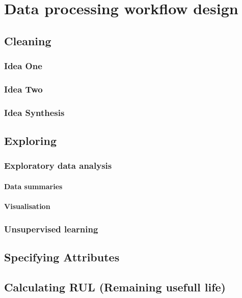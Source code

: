 \section{Data processing workflow design}
	\subsection{Cleaning}
		\subsubsection{Idea One}
		\subsubsection{Idea Two}
		\subsubsection{Idea Synthesis}
	\subsection{Exploring}
		\subsubsection{Exploratory data analysis}
			\paragraph{Data summaries}
			\paragraph{Visualisation}
		\subsubsection{Unsupervised learning}
	\subsection{Specifying Attributes}
	\subsection{Calculating RUL (Remaining usefull life)}
	


